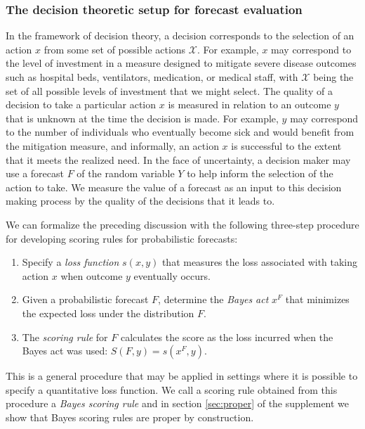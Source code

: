 \documentclass{article}\usepackage[]{graphicx}\usepackage[]{xcolor}
\begin{document}
\subsubsection{The decision theoretic setup for forecast evaluation}
\label{sec:methods.detailed.decisiontheory}


In the framework of decision theory, a decision corresponds to the selection of an action $x$ from some set of possible actions $\mathcal{X}$. For example, $x$ may correspond to the level of investment in a measure designed to mitigate severe disease outcomes such as hospital beds, ventilators, medication, or medical staff, with $\mathcal{X}$ being the set of all possible levels of investment that we might select. The quality of a decision to take a particular action $x$ is measured in relation to an outcome $y$ that is unknown at the time the decision is made. For example, $y$ may correspond to the number of individuals who eventually become sick and would benefit from the mitigation measure, and informally, an action $x$ is successful to the extent that it meets the realized need. In the face of uncertainty, a decision maker may use a forecast $F$ of the random variable $Y$ to help inform the selection of the action to take. We measure the value of a forecast as an input to this decision making process by the quality of the decisions that it leads to.

We can formalize the preceding discussion with the following three-step procedure for developing scoring rules for probabilistic forecasts:
\begin{enumerate}
\item Specify a \emph{loss function} $s(x, y)$ that measures the loss associated with taking action $x$ when outcome $y$ eventually occurs.
\item Given a probabilistic forecast $F$, determine the \emph{Bayes act} $x^F$ that minimizes the expected loss under the distribution $F$.
\item The \emph{scoring rule} for $F$ calculates the score as the loss incurred when the Bayes act was used: $S(F, y) = s(x^F, y)$.
\end{enumerate}
This is a general procedure that may be applied in settings where it is possible to specify a quantitative loss function. We call a scoring rule obtained from this procedure a \emph{Bayes scoring rule} and in section \ref{sec:proper} of the 
supplement we show that Bayes scoring rules are proper by construction.
\end{document}
